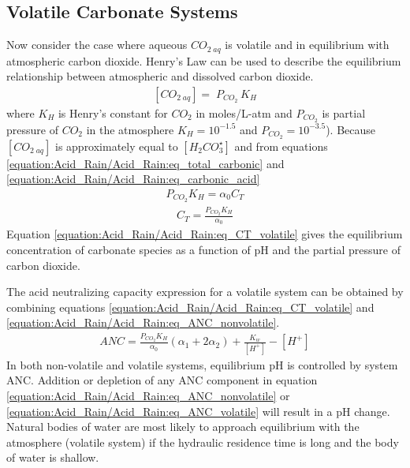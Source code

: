 \documentclass[letterpaper,10pt,english]{sphinxmanual}
\begin{document}
\subsection{Volatile Carbonate Systems}
\label{\detokenize{Acid_Rain/Acid_Rain:volatile-carbonate-systems}}
Now consider the case where aqueous \({CO}_{2\; aq}\) is volatile and in equilibrium with atmospheric carbon dioxide. Henry’s Law can be used to describe the equilibrium relationship between atmospheric and dissolved carbon dioxide.
\begin{equation}\label{equation:Acid_Rain/Acid_Rain:Acid_Rain/Acid_Rain:1}
\begin{split}\left[{CO}_{{2\; aq}} \right]={\; P}_{{CO}_{{2}} {\; }} {K}_{{H}}\end{split}
\end{equation}
where \(K_H\) is Henry’s constant for \(CO_2\) in moles/L-atm and \(P_{CO_2}\) is partial pressure of \(CO_2\) in the atmosphere \(K_H = 10^{-1.5}\)  and \(P_{CO_2} = 10^{-3.5}\)). Because \(\left[{CO}_{{2\; aq}} \right]\) is approximately equal to \(\left[H_2CO_3^{\star} \right]\) and from equations \eqref{equation:Acid_Rain/Acid_Rain:eq_total_carbonic} and \eqref{equation:Acid_Rain/Acid_Rain:eq_carbonic_acid}
\begin{equation}\label{equation:Acid_Rain/Acid_Rain:Acid_Rain/Acid_Rain:2}
\begin{split}P_{CO_2} K_H =\alpha_0 C_T\end{split}
\end{equation}\begin{equation}\label{equation:Acid_Rain/Acid_Rain:eq_CT_volatile}
\begin{split} C_T = \frac{P_{CO_2} K_H}{\alpha_0}\end{split}
\end{equation}
Equation \eqref{equation:Acid_Rain/Acid_Rain:eq_CT_volatile} gives the equilibrium concentration of carbonate species as a function of pH and the partial pressure of carbon dioxide.

The acid neutralizing capacity expression for a volatile system can be obtained by combining equations \eqref{equation:Acid_Rain/Acid_Rain:eq_CT_volatile} and \eqref{equation:Acid_Rain/Acid_Rain:eq_ANC_nonvolatile}.
\begin{equation}\label{equation:Acid_Rain/Acid_Rain:eq_ANC_volatile}
\begin{split} ANC=\frac{P_{CO_2} K_H }{\alpha_0 } (\alpha_1 +2\alpha_2 ) + \frac{K_w }{\left[H^+ \right]} - \left[H^+ \right]\end{split}
\end{equation}
In both non-volatile and volatile systems, equilibrium pH is controlled by system ANC. Addition or depletion of any ANC component in equation \eqref{equation:Acid_Rain/Acid_Rain:eq_ANC_nonvolatile} or \eqref{equation:Acid_Rain/Acid_Rain:eq_ANC_volatile} will result in a pH change. Natural bodies of water are most likely to approach equilibrium with the atmosphere (volatile system) if the hydraulic residence time is long and the body of water is shallow.
\end{document}
